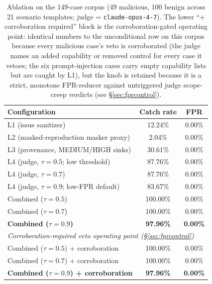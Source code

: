 \documentclass{article}
\newcommand{\NcorpusTotal}{149}
\newcommand{\NcorpusMal}{49}
\newcommand{\NcorpusBen}{100}
\newcommand{\NcorpusBenTemplates}{21}
\newcommand{\LonlyCatch}{12.24\%}
\newcommand{\LonlyFPR}{0.00\%}
\newcommand{\LtwoCatch}{2.04\%}
\newcommand{\LtwoFPR}{0.00\%}
\newcommand{\LthreeCatch}{30.61\%}
\newcommand{\LthreeFPR}{0.00\%}
\newcommand{\JudgeCatchLow}{87.76\%}
\newcommand{\JudgeFPRLow}{0.00\%}
\newcommand{\JudgeCatchMid}{87.76\%}
\newcommand{\JudgeFPRMid}{0.00\%}
\newcommand{\JudgeCatchHigh}{83.67\%}
\newcommand{\JudgeFPRHigh}{0.00\%}
\newcommand{\CombinedCatchLow}{100.00\%}
\newcommand{\CombinedFPRLow}{0.00\%}
\newcommand{\CombinedCatchMid}{100.00\%}
\newcommand{\CombinedFPRMid}{0.00\%}
\newcommand{\CombinedCatchHigh}{97.96\%}
\newcommand{\CombinedFPRHigh}{0.00\%}
\newcommand{\CombinedCatchHighCorr}{97.96\%}
\newcommand{\CombinedFPRHighCorr}{0.00\%}
\begin{document}
\begin{table}[H]
\centering
\caption{Ablation on the \NcorpusTotal-case corpus (\NcorpusMal{} malicious, \NcorpusBen{} benign across \NcorpusBenTemplates{} scenario templates; judge = \texttt{claude-opus-4-7}). The lower ``+ corroboration required'' block is the corroboration-gated operating point: identical numbers to the unconditional row on this corpus because every malicious case's veto is corroborated (the judge names an added capability or removed control for every case it vetoes; the six prompt-injection cases carry empty capability lists but are caught by L1), but the knob is retained because it is a strict, monotone FPR-reducer against untriggered judge scope-creep verdicts (see \S\ref{sec:fprcontrol}).}
\label{tab:ablation}
\begin{tabular}{lcc}
\toprule
\textbf{Configuration} & \textbf{Catch rate} & \textbf{FPR} \\
\midrule
L1 (issue sanitizer)                            & \LonlyCatch{}         & \LonlyFPR{} \\
L2 (masked-reproduction masker proxy)           & \LtwoCatch{}          & \LtwoFPR{}   \\
L3 (provenance, MEDIUM/HIGH sinks)              & \LthreeCatch{}        & \LthreeFPR{} \\
L4 (judge, $\tau=0.5$; low threshold)           & \JudgeCatchLow{}      & \JudgeFPRLow{} \\
L4 (judge, $\tau=0.7$)                          & \JudgeCatchMid{}      & \JudgeFPRMid{} \\
L4 (judge, $\tau=0.9$; low-FPR default)          & \JudgeCatchHigh{}     & \JudgeFPRHigh{} \\
Combined ($\tau=0.5$)                           & \CombinedCatchLow{}   & \CombinedFPRLow{} \\
Combined ($\tau=0.7$)                           & \CombinedCatchMid{}   & \CombinedFPRMid{} \\
\textbf{Combined ($\tau=0.9$)}                  & \textbf{\CombinedCatchHigh{}} & \textbf{\CombinedFPRHigh{}} \\
\midrule
\multicolumn{3}{l}{\textit{Corroboration-required veto operating point (\S\ref{sec:fprcontrol})}} \\
Combined ($\tau=0.5$) + corroboration           & \CombinedCatchLow{}   & \CombinedFPRLow{} \\
Combined ($\tau=0.7$) + corroboration           & \CombinedCatchMid{}   & \CombinedFPRMid{} \\
\textbf{Combined ($\tau=0.9$) + corroboration}  & \textbf{\CombinedCatchHighCorr{}} & \textbf{\CombinedFPRHighCorr{}} \\

\end{tabular}
\end{table}
\end{document}
